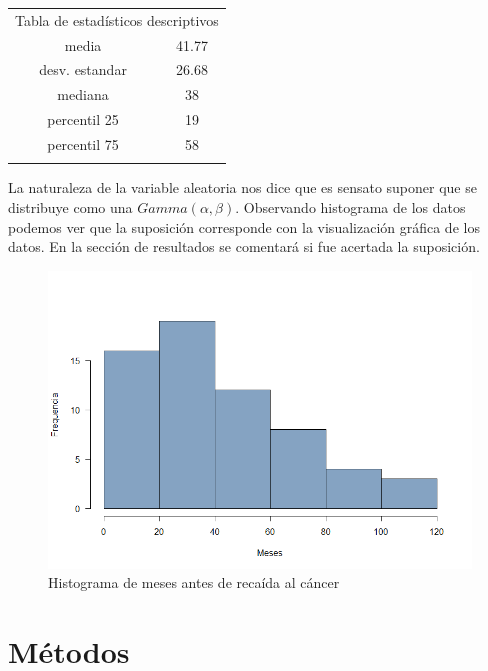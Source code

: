 \documentclass[9pt,twocolumn,twoside,]{pnas-new}
\begin{document}
\begin{table}[htbp]
  \centering
    \begin{tabular}{rr}
          &  \\
    \midrule
    \midrule
    \multicolumn{2}{c}{Tabla de estadísticos descriptivos} \\
    \midrule
    \multicolumn{1}{c}{media} & \multicolumn{1}{c}{41.77} \\
    \multicolumn{1}{c}{desv. estandar} & \multicolumn{1}{c}{26.68} \\
    \multicolumn{1}{c}{mediana } & \multicolumn{1}{c}{38} \\
    \multicolumn{1}{c}{percentil 25} & \multicolumn{1}{c}{19} \\
    \multicolumn{1}{c}{percentil 75} & \multicolumn{1}{c}{58} \\
    \midrule
    \midrule
          &  \\
    \end{tabular}%
\end{table}

La naturaleza de la variable aleatoria nos dice que es sensato suponer
que se distribuye como una \(Gamma(\alpha, \beta)\). Observando
histograma de los datos podemos ver que la suposición corresponde con la
visualización gráfica de los datos. En la sección de resultados se
comentará si fue acertada la suposición.

\begin{figure}[h]
    \centering
    \caption{Histograma de meses antes de recaída al cáncer}
    \includegraphics[scale=0.45]{hist.png}
\end{figure}

\hypertarget{muxe9todos}{%
\section*{Métodos}\label{muxe9todos}}
\end{document}

